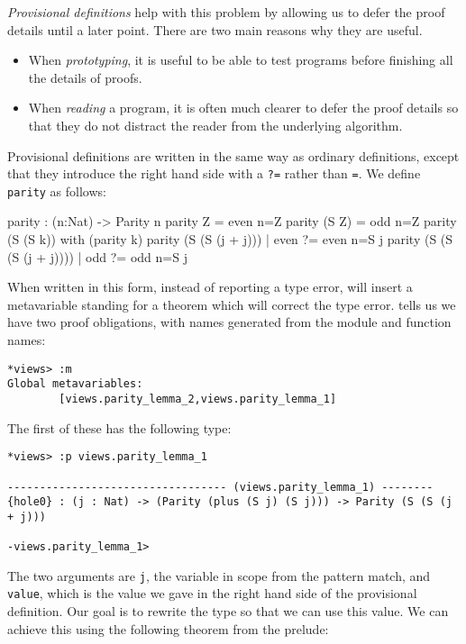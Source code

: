 \emph{Provisional definitions} help with this problem by allowing us to defer the proof details until a later point.
There are two main reasons why they are useful.

\begin{itemize}
\item When \emph{prototyping}, it is useful to be able to test programs before finishing all the details of proofs.  
\item When \emph{reading} a program, it is often much clearer to defer the proof details so that they do not distract the reader from the underlying algorithm.
\end{itemize}

\noindent
Provisional definitions are written in the same way as ordinary definitions, except that they introduce the right hand side with a \texttt{?=} rather than \texttt{=}.
We define \texttt{parity} as follows:

\begin{code}
parity : (n:Nat) -> Parity n
parity Z     = even {n=Z}
parity (S Z) = odd {n=Z}
parity (S (S k)) with (parity k)
  parity (S (S (j + j)))     | even ?= even {n=S j}
  parity (S (S (S (j + j)))) | odd  ?= odd {n=S j}
\end{code}

\noindent
When written in this form, instead of reporting a type error, \Idris{} will insert a metavariable standing for a theorem which will correct the type error.
\Idris{} tells us we have two proof obligations, with names generated from the module and function names:

\begin{lstlisting}
*views> :m 
Global metavariables:
        [views.parity_lemma_2,views.parity_lemma_1]
\end{lstlisting}

\noindent
The first of these has the following type:

\begin{lstlisting}
*views> :p views.parity_lemma_1 

---------------------------------- (views.parity_lemma_1) --------
{hole0} : (j : Nat) -> (Parity (plus (S j) (S j))) -> Parity (S (S (j + j)))

-views.parity_lemma_1>  
\end{lstlisting}

\noindent
The two arguments are \texttt{j}, the variable in scope from the pattern match, and \texttt{value}, which is the value we gave in the right hand side of the provisional definition.
Our goal is to rewrite the type so that we can use this value.
We can achieve this using the following theorem from the prelude:

